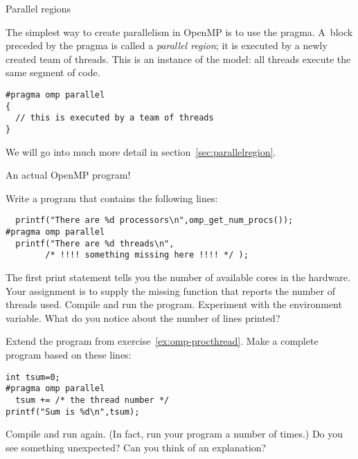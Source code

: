 
 {Parallel regions}

The simplest way to create parallelism in OpenMP is to use
the  pragma. A~block preceded by the  pragma
is called a \emph{parallel region}; it
is executed by a newly created team of threads. 
This is an instance of the  model: all threads execute the same
segment of code.
\begin{verbatim}
#pragma omp parallel
{
  // this is executed by a team of threads
}
\end{verbatim}

We will go into much more detail in section~\ref{sec:parallelregion}.

 {An actual OpenMP program!}

\begin{exercise}
  \label{ex:omp-procthread}
  Write a program that contains the following lines:
\begin{verbatim}
  printf("There are %d processors\n",omp_get_num_procs());
#pragma omp parallel
  printf("There are %d threads\n",
        /* !!!! something missing here !!!! */ );
\end{verbatim}
The first print statement tells you the number of available cores in
the hardware. Your assignment is to
supply the missing function that reports the number
of threads used. Compile and run the program. Experiment with the
 environment variable. What do you notice about the
number of lines printed?
\end{exercise}

\begin{exercise}
  \label{ex:omp-procthreadn}
  Extend the program from exercise~\ref{ex:omp-procthread}. Make a
  complete program based on these lines:
\begin{verbatim}
int tsum=0;
#pragma omp parallel
  tsum += /* the thread number */
printf("Sum is %d\n",tsum);
\end{verbatim}
Compile and run again. (In fact, run your program a number of times.)
Do you see something unexpected? Can you think
of an explanation?
\end{exercise}

\endinput

\Level 1 {Code and execution structure}
\label{sec:omp-code-structure}

